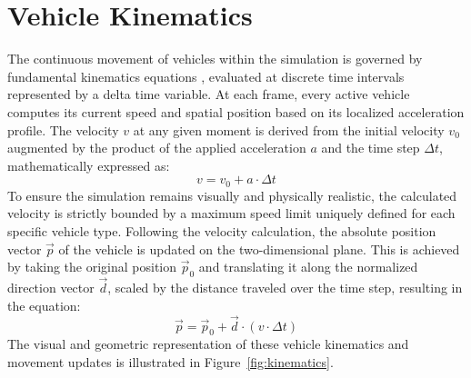 \documentclass[../report_main.tex]{subfiles}
\begin{document}
\section{Vehicle Kinematics}
The continuous movement of vehicles within the simulation is governed by fundamental kinematics equations \cite{sgk2006vatly}, evaluated at discrete time intervals represented by a delta time variable. At each frame, every active vehicle computes its current speed and spatial position based on its localized acceleration profile. The velocity $v$ at any given moment is derived from the initial velocity $v_0$ augmented by the product of the applied acceleration $a$ and the time step $\Delta t$, mathematically expressed as:
\begin{equation}
    v = v_0 + a \cdot \Delta t
\end{equation}
To ensure the simulation remains visually and physically realistic, the calculated velocity is strictly bounded by a maximum speed limit uniquely defined for each specific vehicle type. Following the velocity calculation, the absolute position vector $\overrightarrow{p}$ of the vehicle is updated on the two-dimensional plane. This is achieved by taking the original position $\overrightarrow{p}_0$ and translating it along the normalized direction vector $\overrightarrow{d}$, scaled by the distance traveled over the time step, resulting in the equation:
\begin{equation}
    \overrightarrow{p} = \overrightarrow{p}_0 + \overrightarrow{d} \cdot (v \cdot \Delta t)
\end{equation}
The visual and geometric representation of these vehicle kinematics and movement updates is illustrated in Figure~\ref{fig:kinematics}.
\end{document}
